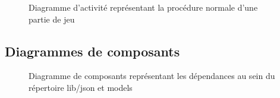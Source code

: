 \documentclass[a4paper]{report}
\begin{document}
\begin{figure}[H]
    \caption{\label{3} Diagramme d'activité représentant la procédure normale d'une partie de jeu}
\end{figure}

\subsection{Diagrammes de composants}

\begin{figure}[H]
    \caption{\label{3} Diagramme de composants représentant les dépendances au sein du répertoire lib/json et models}
\end{figure}
\end{document}
